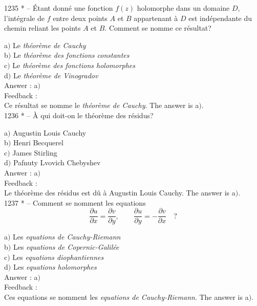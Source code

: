 ﻿\documentclass[letterpaper, 12pt]{article}
\begin{document}
1235 * -- \'Etant donn\'e une fonction $f(z)$ holomorphe dans un
domaine $D$, l'int\'egrale de $f$ entre deux points $A$ et $B$
appartenant \`a $D$ est ind\'ependante du chemin reliant les points
$A$ et $B$. Comment se nomme ce r\'esultat?

a$)$ Le {\sl th\'eor\`eme de Cauchy} \\
b$)$ Le {\sl th\'eor\`eme des fonctions constantes} \\
c$)$ Le {\sl th\'eor\`eme des fonctions holomorphes} \\
d$)$ Le {\sl th\'eor\`eme de Vinogradov}\\

Answer : a$)$\\

Feedback : \\
Ce r\'esultat se nomme le {\sl th\'eor\`eme de Cauchy}.
The answer is a$)$.\\

1236 * -- \`A qui doit-on le th\'eor\`eme des r\'esidus?

a$)$ Augustin Louis Cauchy \\
b$)$ Henri Becquerel \\
c$)$ James Stirling \\
d$)$ Pafnuty Lvovich Chebyshev\\

Answer : a$)$\\

Feedback : \\
Le th\'eor\`eme des r\'esidus est d\^u \`a Augustin Louis Cauchy.
The answer is a$)$.\\

1237 * -- Comment se nomment les equations
$$\displaystyle{\frac{\partial u}{\partial x}=\frac{\partial v}{\partial
y},\quad\quad\frac{\partial u}{\partial y}=-\frac{\partial v}{\partial
x}}\quad?$$

a$)$ Les {\sl equations de Cauchy-Riemann} \\
b$)$ Les {\sl equations de Copernic-Galil\'ee} \\
c$)$ Les {\sl equations diophantiennes} \\
d$)$ Les {\sl equations holomorphes}\\

Answer : a$)$\\

Feedback : \\
Ces equations se nomment les {\sl equations de Cauchy-Riemann}.
The answer is a$)$.\\
\end{document}
